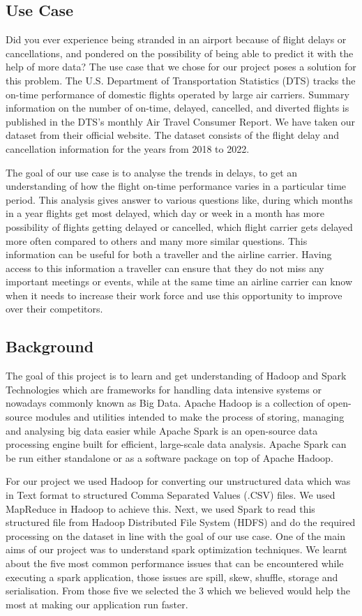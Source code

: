 \subsection{Use Case}
Did you ever experience being stranded in an airport because of flight delays or cancellations, and pondered on the possibility of being able to predict it with the help of more data? The use case that we chose for our project poses a solution for this problem. The U.S. Department of Transportation Statistics (DTS) tracks the on-time performance of domestic flights operated by large air carriers\cite{dataset}. Summary information on the number of on-time, delayed, cancelled, and diverted flights is published in the DTS's monthly Air Travel Consumer Report. We have taken our dataset from their official website. The dataset consists of the flight delay and cancellation information for the years from 2018 to 2022.

The goal of our use case is to analyse the trends in delays, to get an understanding of how the flight on-time performance varies in a particular time period. This analysis gives answer to various questions like, during which months in a year flights get most delayed, which day or week in a month has more possibility of flights getting delayed or cancelled, which flight carrier gets delayed more often compared to others and many more similar questions. This information can be useful for both a traveller and the airline carrier. Having access to this information a traveller can ensure that they do not miss any important meetings or events, while at the same time an airline carrier can know when it needs to increase their work force and use this opportunity to improve over their competitors.

\subsection{Background}
The goal of this project is to learn and get understanding of Hadoop and Spark Technologies which are frameworks for handling data intensive systems or nowadays commonly known as Big Data. Apache Hadoop is a collection of open-source modules and utilities intended to make the process of storing, managing and analysing big data easier while Apache Spark is an open-source data processing engine built for efficient, large-scale data analysis. Apache Spark can be run either standalone or as a software package on top of Apache Hadoop.

For our project we used Hadoop for converting our unstructured data which was in Text format to structured Comma Separated Values (.CSV) files. We used MapReduce in Hadoop to achieve this. Next, we used Spark to read this structured file from Hadoop Distributed File System (HDFS) and do the required processing on the dataset in line with the goal of our use case. One of the main aims of our project was to understand spark optimization techniques. We learnt about the five most common performance issues that can be encountered while executing a spark application, those issues are spill, skew, shuffle, storage and serialisation. From those five we selected the 3 which we believed would help the most at making our application run faster. 

